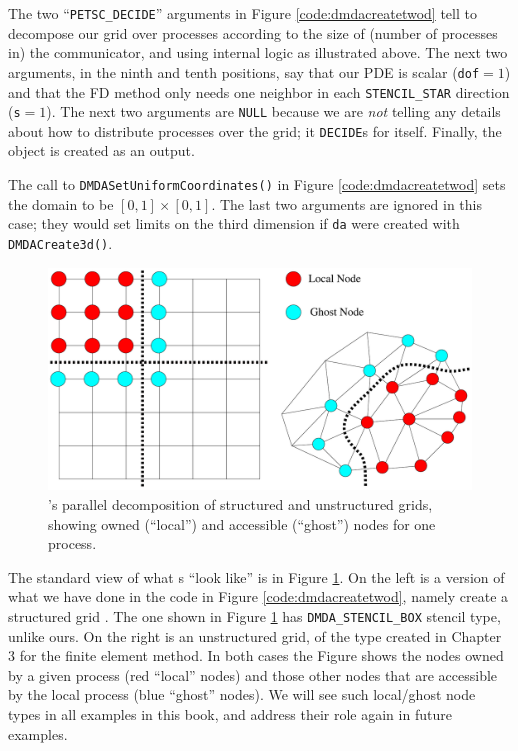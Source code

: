 The two ``\texttt{PETSC\_DECIDE}'' arguments in Figure \ref{code:dmdacreatetwod} tell \PETSc to decompose our grid over \MPI processes according to the size of (number of processes in) the \MPI communicator, and using \PETSc internal logic as illustrated above.  The next two arguments, in the ninth and tenth positions, say that our PDE is scalar (\texttt{dof}$=1$) and that the FD method only needs one neighbor in each \texttt{STENCIL\_STAR} direction (\texttt{s}$=1$).  The next two arguments are \texttt{NULL} because we are \emph{not} telling \PETSc any details about how to distribute processes over the grid; it \texttt{DECIDE}s for itself.  Finally, the \pDMDA object is created as an output.

The call to \texttt{DMDASetUniformCoordinates()} in Figure \ref{code:dmdacreatetwod} sets the domain to be $[0,1]\times[0,1]$.  The last two arguments are ignored in this case; they would set limits on the third dimension if \texttt{da} were created with \texttt{DMDACreate3d()}.

\begin{figure}
\includegraphics[width=\textwidth]{petscghostvalues}
\caption{\PETSc's parallel decomposition of structured and unstructured grids, showing owned (``local'') and accessible (``ghost'') nodes for one process.}
\label{fig:petscghostvalues}
\end{figure}

The standard \PETSc view of what \pDM s ``look like'' is in Figure \ref{fig:petscghostvalues}.  On the left is a version of what we have done in the code in Figure \ref{code:dmdacreatetwod}, namely create a structured grid \pDM.  The one shown in Figure \ref{fig:petscghostvalues} has \texttt{DMDA\_STENCIL\_BOX} stencil type, unlike ours.  On the right is an unstructured grid, of the type created in Chapter 3 for the finite element method.  In both cases the Figure shows the nodes owned by a given process (red ``local'' nodes) and those other nodes that are accessible by the local process (blue ``ghost'' nodes).  We will see such local/ghost node types in all examples in this book, and address their role again in future examples.


